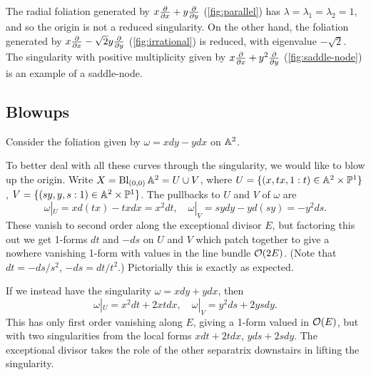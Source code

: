 \begin{example}
    The radial foliation generated by $x\pdv{}{x}+y\pdv{}{y}$
    (\cref{fig:parallel}) has $\lambda=\lambda_1=\lambda_2=1$, and so the origin
    is not a reduced singularity. On the other hand, the foliation generated by
    $x\pdv{}{x}-\sqrt2y\pdv{}{y}$ (\cref{fig:irrational}) is reduced, with
    eigenvalue $-\sqrt2$. The singularity with positive multiplicity given
    by $x\pdv{}{x}+y^2\pdv{}{y}$ (\cref{fig:saddle-node}) is an example of a
    saddle-node.
\end{example}

\subsection{Blowups}



\begin{example}
    Consider the foliation given by $\omega=xdy-ydx$ on $\mathbb{A}^2$. %

    To better deal with all these curves through the singularity, we would like
    to blow up the origin. Write $X=\operatorname{Bl}_{(0,0)}\mathbb{A}^2=U\cup V$, where
    $U=\{(x,tx,1:t)\in\mathbb{A}^2\times\mathbb{P}^1\}$, $V=\{(sy,y,s:1)\in\mathbb{A}^2\times\mathbb{P}^1\}$.
    The pullbacks to $U$ and $V$ of $\omega$ are
    \begin{equation*}
        \omega|_U = xd(tx)-txdx = x^2dt, \quad
        \omega|_V = sydy - yd(sy) = -y^2ds.
    \end{equation*}
    These vanish to second order along the exceptional divisor $E$, but
    factoring this out we get 1-forms $dt$ and $-ds$ on $U$ and $V$ which patch
    together to give a nowhere vanishing 1-form with values in the line bundle
    $\mathcal{O}(2E)$. (Note that $dt=-ds/s^2$, $-ds=dt/t^2$.) Pictorially this
    is exactly as expected. %
\end{example}

\begin{example}
    If we instead have the singularity $\omega=xdy+ydx$, then
    \begin{equation*}
        \omega|_U = x^2dt + 2xtdx, \quad
        \omega|_V = y^2ds+2ysdy.
    \end{equation*}
    This has only first order vanishing along $E$, giving a 1-form valued in
    $\mathcal{O}(E)$, but with two singularities from the local forms $xdt+2tdx$,
    $yds+2sdy$. The exceptional divisor takes the role of the other separatrix
    downstairs in lifting the singularity.
\end{example}

